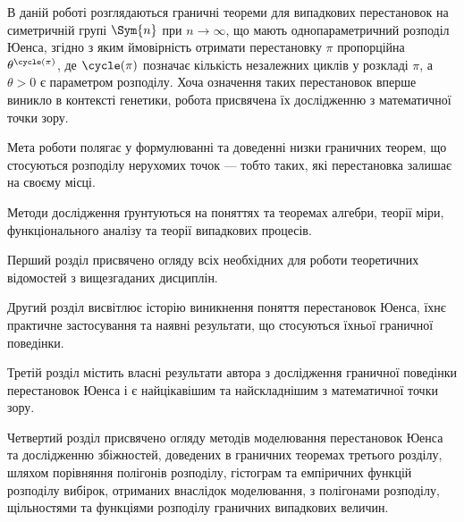 \hspace{\parindent}
В даній роботі розглядаються граничні теореми для
випадкових перестановок на симетричній групі $\Sym{n}$
при $n\to\infty$, що мають однопараметричний розподіл Юенса,
згідно з яким ймовірність отримати перестановку
$\pi$ пропорційна $\theta^{\cycle(\pi)}$, де
$\cycle(\pi)$ позначає кількість незалежних
циклів у розкладі $\pi$, а $\theta > 0$
є параметром розподілу.
Хоча означення таких перестановок вперше
виникло в контексті генетики, робота присвячена
їх дослідженню з математичної точки зору.

Мета роботи полягає у формулюванні та доведенні
низки граничних теорем, що стосуються розподілу
нерухомих точок --- тобто таких, які перестановка
залишає на своєму місці.

Методи дослідження ґрунтуються на поняттях та теоремах
алгебри, теорії міри, функціонального аналізу та теорії випадкових процесів.

Перший розділ присвячено огляду всіх необхідних
для роботи теоретичних відомостей з вищезгаданих дисциплін.

Другий розділ висвітлює історію виникнення
поняття перестановок Юенса, їхнє практичне застосування та
наявні результати, що стосуються їхньої граничної поведінки.

Третій розділ містить власні результати автора з дослідження
граничної поведінки перестановок Юенса і є
найцікавішим та найскладнішим з математичної точки зору.

Четвертий розділ присвячено огляду методів моделювання
перестановок Юенса та дослідженню збіжностей,
доведених в граничних теоремах третього розділу,
шляхом порівняння полігонів розподілу, гістограм
та емпіричних функцій розподілу вибірок, отриманих
внаслідок моделювання, з
полігонами розподілу, щільностями та функціями розподілу
граничних випадкових величин.
